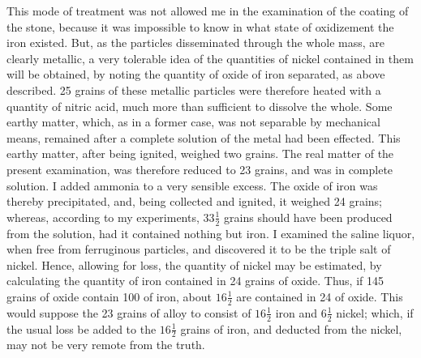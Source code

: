 \documentclass[a4paper, 12pt, oneside, twocolumn]{article}
\begin{document}
This mode of treatment was not allowed me in the examination of the coating of the stone, because it was impossible to know in what state of oxidizement the iron existed. But, as the particles disseminated through the whole mass, are clearly metallic, a very tolerable idea of the quantities of nickel contained in them will be obtained, by noting the quantity of oxide of iron separated, as above described. 25 grains of these metallic particles were therefore heated with a quantity of nitric acid, much more than sufficient to dissolve the whole. Some earthy matter, which, as in a former case, was not separable by mechanical means, remained after a complete solution of the metal had been effected. This earthy matter, after being ignited, weighed two grains. The real matter of the present examination, was therefore reduced to 23 grains, and was in complete solution. I added ammonia to a very sensible excess. The oxide of iron was thereby precipitated, and, being collected and ignited, it weighed 24 grains; whereas, according to my experiments, $33\frac{1}{2}$ grains should have been produced from the solution, had it contained nothing but iron. I examined the saline liquor, when free from ferruginous particles, and discovered it to be the triple salt of nickel. Hence, allowing for loss, the quantity of nickel may be estimated, by calculating the quantity of iron contained in 24 grains of oxide. Thus, if 145 grains of oxide contain 100 of iron, about $16\frac{1}{2}$ are contained in 24 of oxide. This would suppose the 23 grains of alloy to consist of $16\frac{1}{2}$ iron and $6\frac{1}{2}$ nickel; which, if the usual loss be added to the $16\frac{1}{2}$ grains of iron, and deducted from the nickel, may not be very remote from the truth.
\end{document}
